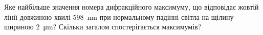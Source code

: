 %
%
^^I^^IЯке найбільше значення номера дифракційного максимуму, що відповідає жовтій лінії довжиною хвилі \SI{598}{\nano\metre} при нормальному падінні світла на щілину шириною \SI{2}{\micro\metre}? Скільки загалом спостерігається максимумів?
